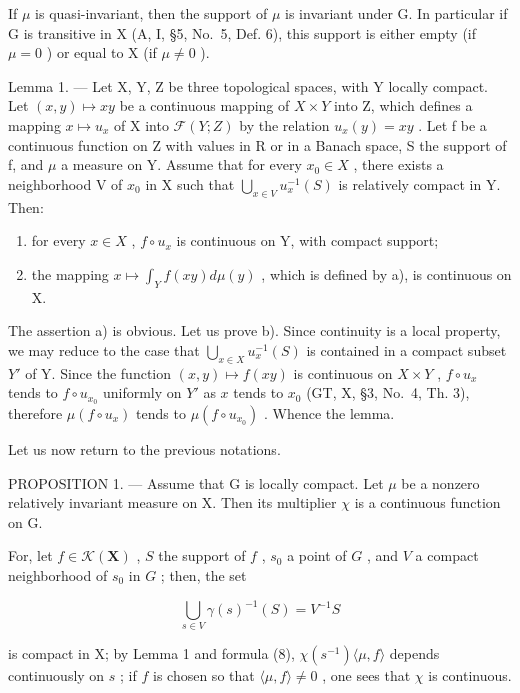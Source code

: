 If \(\mu\) is quasi-invariant, then the support of \(\mu\) is invariant under G. In particular if G is transitive in X (A, I, §5, No.~5, Def. 6), this support is either empty (if \(\mu = 0\) ) or equal to X (if \(\mu \neq 0\) ).

Lemma 1. --- Let X, Y, Z be three topological spaces, with Y locally compact. Let \((x,y)\mapsto xy\) be a continuous mapping of \(X\times Y\) into Z, which defines a mapping \(x\mapsto u_{x}\) of X into \(\mathcal{F}(Y;Z)\) by the relation \(u_{x}(y)=xy\) . Let f be a continuous function on Z with values in R or in a Banach space, S the support of f, and \(\mu\) a measure on Y. Assume that for every \(x_{0}\in X\) , there exists a neighborhood V of \(x_{0}\) in X such that \(\bigcup_{x\in V}u_{x}^{-1}(S)\) is relatively compact in Y. Then:

\begin{enumerate}
\def\labelenumi{\alph{enumi})}
\tightlist
\item
  for every \(x \in X\) , \(f \circ u_{x}\) is continuous on Y, with compact support;
\item
  the mapping \(x \mapsto \int_{Y} f(xy) d\mu(y)\) , which is defined by a), is continuous on X.
\end{enumerate}

The assertion a) is obvious. Let us prove b). Since continuity is a local property, we may reduce to the case that \(\bigcup_{x\in X}u_x^{-1}(S)\) is contained in a compact subset \(Y'\) of Y. Since the function \((x,y)\mapsto f(xy)\) is continuous on \(X\times Y\) , \(f\circ u_x\) tends to \(f\circ u_{x_0}\) uniformly on \(Y'\) as \(x\) tends to \(x_0\) (GT, X, §3, No.~4, Th. 3), therefore \(\mu(f \circ u_x)\) tends to \(\mu(f \circ u_{x_0})\) . Whence the lemma.

Let us now return to the previous notations.

PROPOSITION 1. --- Assume that G is locally compact. Let \(\mu\) be a nonzero relatively invariant measure on X. Then its multiplier \(\chi\) is a continuous function on G.

For, let \(f \in \mathcal{K}(\mathbf{X})\) , \(S\) the support of \(f\) , \(s_0\) a point of \(G\) , and \(V\) a compact neighborhood of \(s_0\) in \(G\) ; then, the set

\[
\bigcup_ {s \in V} \gamma (s) ^ {- 1} (S) = V ^ {- 1} S
\]

is compact in X; by Lemma 1 and formula (8), \(\chi(s^{-1})\langle\mu, f\rangle\) depends continuously on \(s\) ; if \(f\) is chosen so that \(\langle\mu, f\rangle \neq 0\) , one sees that \(\chi\) is continuous.

